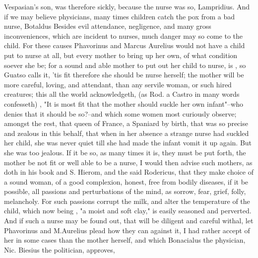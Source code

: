 Vespasian's son, was therefore sickly, because the nurse was so, Lampridius.
And if we may believe physicians, many times children catch the pox from a bad
nurse, Botaldus  Besides evil
attendance, negligence, and many gross inconveniences, which are incident to
nurses, much danger may so come to the child. For these
causes \Aristotle{}  Phavorinus and
Marcus Aurelius would not have a child put to nurse at all, but every mother to
bring up her own, of what condition soever she be; for a sound and able mother
to put out her child to nurse, is , so
Guatso calls it, 'tis fit therefore she should be nurse
herself; the mother will be more careful, loving, and attendant, than any
servile woman, or such hired creatures; this all the world acknowledgeth,
 (as Rod. a Castro  in many words confesseth) , "It is most fit that the mother should suckle her own infant"--who
denies that it should be so?--and which some women most curiously observe;
amongst the rest, that queen of France, a Spaniard by
birth, that was so precise and zealous in this behalf, that when in her absence
a strange nurse had suckled her child, she was never quiet till she had made
the infant vomit it up again. But she was too jealous. If it be so, as many
times it is, they must be put forth, the mother be not fit or well able to be a
nurse, I would then advise such mothers, as \Plutarch{} doth
in his book  and
S. Hierom,  and the said
Rodericus, that they make choice of a sound woman, of a good complexion,
honest, free from bodily diseases, if it be possible, all passions and
perturbations of the mind, as sorrow, fear, grief, folly,
melancholy. For such passions corrupt the milk, and alter the temperature of
the child, which now being , "a
moist and soft clay," is easily seasoned and perverted. And if such a nurse may
be found out, that will be diligent and careful withal, let Phavorinus and M.Aurelius plead how they can against it, I had rather accept of her in some
cases than the mother herself, and which Bonacialus the physician, Nic. Biesius
the politician,  approves,
